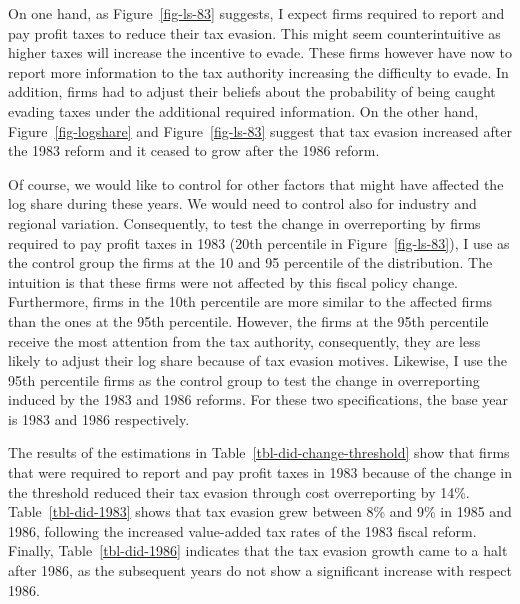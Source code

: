 \documentclass[
  12pt]{article}
\theoremstyle{definition}
\theoremstyle{remark}
\begin{document}
On one hand, as Figure~\ref{fig-ls-83} suggests, I expect firms required
to report and pay profit taxes to reduce their tax evasion. This might
seem counterintuitive as higher taxes will increase the incentive to
evade. These firms however have now to report more information to the
tax authority increasing the difficulty to evade. In addition, firms had
to adjust their beliefs about the probability of being caught evading
taxes under the additional required information. On the other hand,
Figure~\ref{fig-logshare} and Figure~\ref{fig-ls-83} suggest that tax
evasion increased after the 1983 reform and it ceased to grow after the
1986 reform.

Of course, we would like to control for other factors that might have
affected the log share during these years. We would need to control also
for industry and regional variation. Consequently, to test the change in
overreporting by firms required to pay profit taxes in 1983 (20th
percentile in Figure~\ref{fig-ls-83}), I use as the control group the
firms at the 10 and 95 percentile of the distribution. The intuition is
that these firms were not affected by this fiscal policy change.
Furthermore, firms in the 10th percentile are more similar to the
affected firms than the ones at the 95th percentile. However, the firms
at the 95th percentile receive the most attention from the tax
authority, consequently, they are less likely to adjust their log share
because of tax evasion motives. Likewise, I use the 95th percentile
firms as the control group to test the change in overreporting induced
by the 1983 and 1986 reforms. For these two specifications, the base
year is 1983 and 1986 respectively.

The results of the estimations in Table~\ref{tbl-did-change-threshold}
show that firms that were required to report and pay profit taxes in
1983 because of the change in the threshold reduced their tax evasion
through cost overreporting by 14\%. Table~\ref{tbl-did-1983} shows that
tax evasion grew between 8\% and 9\% in 1985 and 1986, following the
increased value-added tax rates of the 1983 fiscal reform. Finally,
Table~\ref{tbl-did-1986} indicates that the tax evasion growth came to a
halt after 1986, as the subsequent years do not show a significant
increase with respect 1986.
\end{document}
